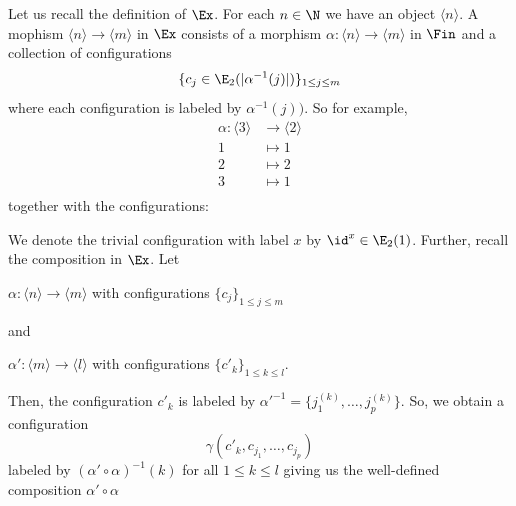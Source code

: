 \begin{rem}
    Let us recall the definition of $\Ex$. For each $n \in \N$ we have an object $\langle n \rangle$. 
    A mophism $\langle n \rangle \to \langle m \rangle$ in $\Ex$ consists of a morphism 
    $\alpha \colon \langle n \rangle \to \langle m \rangle$ in $\Fin$ and a collection of configurations
    $$\{c_j \in \E_2(|\alpha^{-1}(j)|)\}_{1 \leq j \leq m}$$
    where each configuration is labeled by $\alpha^{-1}(j))$.
    So for example, 
    \begin{align*}
        \alpha \colon \langle 3 \rangle &\to \langle 2 \rangle \\
        1 &\mapsto 1 \\
        2 &\mapsto 2 \\
        3 &\mapsto 1 \\
    \end{align*}
    together with the configurations:
    \begin{center}
    \end{center}
    We denote the trivial configuration with label $x$ by $\id^x \in \E_2(1)$.
    Further, recall the composition in $\Ex$. Let 
    \begin{center}
        $\alpha \colon \langle n \rangle \to \langle m \rangle$ 
        with configurations $\{c_j\}_{1 \leq j \leq m}$ 
    \end{center}
    and 
    \begin{center}
        $\alpha' \colon \langle m \rangle \to \langle l \rangle$ 
        with configurations $\{c'_k\}_{1 \leq k \leq l}$. 
    \end{center}
    Then, the configuration $c'_k$ is labeled 
    by $\alpha'^{-1}=\{j_1^{(k)}, \dots, j_p^{(k)}\}$. So, we obtain a configuration 
    \[
        \gamma(c'_k, c_{j_1}, \dots, c_{j_p})
    \]
    labeled by $(\alpha' \circ \alpha)^{-1}(k)$ for all $1 \leq k \leq l$ 
    giving us the well-defined composition $\alpha' \circ \alpha$
\end{rem}

